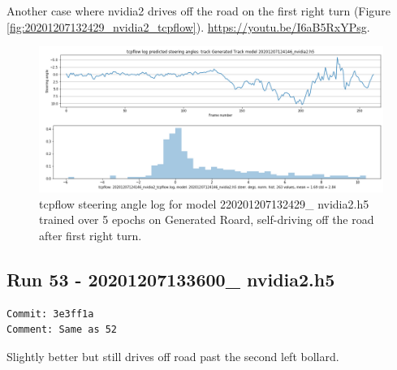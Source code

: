 Another case where nvidia2 drives off the road on the first right turn (Figure \ref{fig:20201207132429_nvidia2_tcpflow}). \url{https://youtu.be/I6aB5RxYPsg}.
\begin{figure}[ht]
 \centering 
 \includegraphics[width=\textwidth]{Figures/20201207132429_nvidia2_tcpflow.png}
 \caption{tcpflow steering angle log for model 220201207132429\_ nvidia2.h5 trained over 5 epochs on Generated Roard, self-driving off the road after first right turn.}
 \label{fig:220201207132429_nvidia2_tcpflow}
\end{figure}

\subsection{Run 53 - 20201207133600\_ nvidia2.h5 }
\begin{verbatim}
Commit: 3e3ff1a
Comment: Same as 52
\end{verbatim}

Slightly better but still drives off road past the second left bollard.

